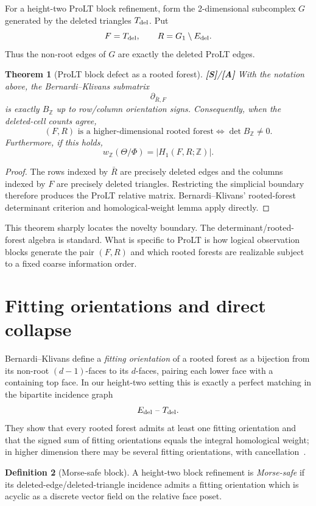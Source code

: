 \documentclass[11pt]{article}
\newtheorem{theorem}{Theorem}[section]
\theoremstyle{definition}
\newtheorem{definition}[theorem]{Definition}
\newcommand{\statusS}{\textbf{[S]}}
\newcommand{\statusA}{\textbf{[A]}}
\begin{document}
For a height-two ProLT block refinement, form the 2-dimensional subcomplex $G$ generated by the deleted triangles $T_{\rm del}$. Put
\[
F=T_{\rm del},
\qquad
R=G_1\setminus E_{\rm del}.
\]
Thus the non-root edges of $G$ are exactly the deleted ProLT edges.

\begin{theorem}[ProLT block defect as a rooted forest]\label{thm:rootedtranslation}
\statusS/\statusA\;
With the notation above, the Bernardi--Klivans submatrix
\[
\partial_{\bar R,F}
\]
is exactly $B_{\mathbb Z}$ up to row/column orientation signs. Consequently, when the deleted-cell counts agree,
\[
(F,R)\text{ is a higher-dimensional rooted forest}
\iff
\det B_{\mathbb Z}\ne0.
\]
Furthermore, if this holds,
\[
w_{\mathbb Z}(\Theta/\Phi)
=|H_1(F,R;\mathbb Z)|.
\]
\end{theorem}

\begin{proof}
The rows indexed by $\bar R$ are precisely deleted edges and the columns indexed by $F$ are precisely deleted triangles. Restricting the simplicial boundary therefore produces the ProLT relative matrix. Bernardi--Klivans' rooted-forest determinant criterion and homological-weight lemma apply directly.
\end{proof}

This theorem sharply locates the novelty boundary. The determinant/rooted-forest algebra is standard. What is specific to ProLT is how logical observation blocks generate the pair $(F,R)$ and which rooted forests are realizable subject to a fixed coarse information order.

\section{Fitting orientations and direct collapse}

Bernardi--Klivans define a \emph{fitting orientation} of a rooted forest as a bijection from its non-root $(d-1)$-faces to its $d$-faces, pairing each lower face with a containing top face. In our height-two setting this is exactly a perfect matching in the bipartite incidence graph
\[
E_{\rm del}\ \text{--}\ T_{\rm del}.
\]
They show that every rooted forest admits at least one fitting orientation and that the signed sum of fitting orientations equals the integral homological weight; in higher dimension there may be several fitting orientations, with cancellation~\cite{BernardiKlivans2016}.

\begin{definition}[Morse-safe block]
A height-two block refinement is \emph{Morse-safe} if its deleted-edge/deleted-triangle incidence admits a fitting orientation which is acyclic as a discrete vector field on the relative face poset.
\end{definition}
\end{document}
